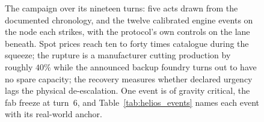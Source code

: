 \begin{figure}[htbp]
\caption[The H\'ELIOS campaign, turn by turn]{The campaign over its nineteen turns: five acts
drawn from the documented chronology, and the twelve calibrated engine events on the node each
strikes, with the protocol's own controls on the lane beneath. Spot prices reach ten to forty
times catalogue during the squeeze; the rupture is a manufacturer cutting production by roughly
$40\%$ while the announced backup foundry turns out to have no spare capacity; the recovery
measures whether declared urgency lags the physical de-escalation. One event is of gravity
critical, the fab freeze at turn~6, and Table~\ref{tab:helios_events} names each event with its
real-world anchor.}
\label{fig:helios_timeline}
\end{figure}

